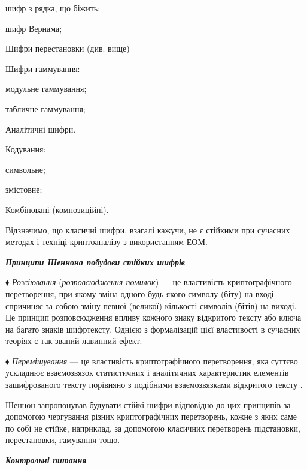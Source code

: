 шифр з рядка, що біжить;

шифр Вернама;

Шифри перестановки (див. вище)

Шифри гаммування:

модульне гаммування;

табличне гаммування;


\bigskip

Аналітичні шифри.

Кодування:

символьне;

змістовне;

Комбіновані (композиційні).

Відзначимо,  що класичні  шифри, взагалі кажучи, не є стійкими при сучасних
методах і техніці криптоаналізу з використанням ЕОМ.


\bigskip

{\centering\bfseries\itshape
Принципи Шеннона побудови стійких  шифрів
\par}


\bigskip


\bigskip

$\blacklozenge$ \textit{Розсіювання} (\textit{розповсюдження помилок}) --- це
властивість криптографічного перетворення, при якому зміна одного будь-якого 
символу (біту) на вході спричиняє за собою зміну певної (великої)  кількості
символів (бітів) на виході. Це принцип розповсюдження впливу кожного знаку 
відкритого тексту або ключа на багато знаків шифртексту. Однією з формалізацій
цієї властивості  в сучасних теоріях є так званий лавинний ефект.

$\blacklozenge$ \textit{Перемішування }--- це властивість криптографічного
перетворення, яка суттєво ускладнює взаємозв{\textquotesingle}язок статистичних
 і аналітичних характеристик елементів зашифрованого тексту порівняно з
подібними взаємозв{\textquotesingle}язками відкритого тексту . 

 Шеннон запропонував будувати стійкі шифри відповідно до цих принципів за
допомогою чергування різних криптографічних перетворень, кожне з яких саме по
собі не стійке, наприклад, за допомогою класичних перетворень підстановки,
перестановки, гамування тощо.


\bigskip


\bigskip

{\centering\bfseries\itshape
Контрольні питання
\par}


\bigskip


